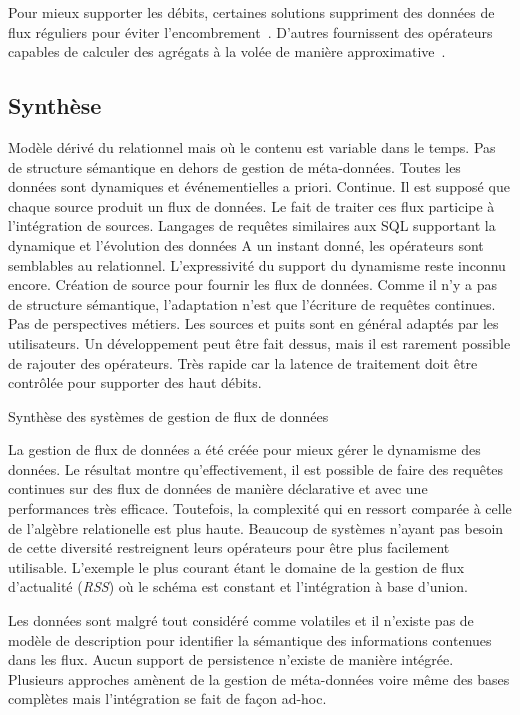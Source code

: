 Pour mieux supporter les débits, certaines solutions suppriment des données de flux réguliers pour éviter l'encombrement~\cite{Tatbul:load-shedding}. D'autres fournissent des opérateurs capables de calculer des agrégats à la volée de manière approximative~\cite{Babcock:sampling}.

\subsection{Synthèse}
\begin{table}[!ht]
\criteretabDonnee
    {Modèle dérivé du relationnel mais où le contenu est variable dans le temps.}
    {Pas de structure sémantique en dehors de gestion de méta-données.}
    {Toutes les données sont dynamiques et événementielles a priori.}
\criteretabTraitement
    {Continue.}
    {Il est supposé que chaque source produit un flux de données. Le fait de traiter ces flux participe à l'intégration de sources.}
    {Langages de requêtes similaires aux SQL supportant la dynamique et l'évolution des données}
    {A un instant donné, les opérateurs sont semblables au relationnel. L'expressivité du support du dynamisme reste inconnu encore.}
\criteretabAdaptabilite
    {Création de source pour fournir les flux de données. Comme il n'y a pas de structure sémantique, l'adaptation n'est que l'écriture de requêtes continues.}
    {Pas de perspectives métiers.}
    {Les sources et puits sont en général adaptés par les utilisateurs. Un développement peut être fait dessus, mais il est rarement possible de rajouter des opérateurs.}
    {Très rapide car la latence de traitement doit être contrôlée pour supporter des haut débits.}
\caption{Synthèse des systèmes de gestion de flux de données}\label{tab:rw:supervision:sgfd:synthese}
\end{table}

La gestion de flux de données a été créée pour mieux gérer le dynamisme des données. Le résultat montre qu'effectivement, il est possible de faire des requêtes continues sur des flux de données de manière déclarative et avec une performances très efficace. Toutefois, la complexité qui en ressort comparée à celle de l'algèbre relationelle est plus haute. Beaucoup de systèmes n'ayant pas besoin de cette diversité restreignent leurs opérateurs pour être plus facilement utilisable. L'exemple le plus courant étant le domaine de la gestion de flux d'actualité (\textit{RSS}) où le schéma est constant et l'intégration à base d'union.

Les données sont malgré tout considéré comme volatiles et il n'existe pas de modèle de description pour identifier la sémantique des informations contenues dans les flux. Aucun support de persistence n'existe de manière intégrée. Plusieurs approches amènent de la gestion de méta-données voire même des bases complètes mais l'intégration se fait de façon ad-hoc.
